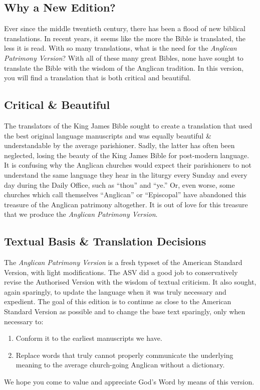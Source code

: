 \documentclass[twocolumn,twoside,titlepage,10pt]{book}\usepackage[paperheight=210mm,paperwidth=148mm,inner=25.4mm,outer=20mm,top=15mm,bottom=15mm,heightrounded]{geometry}
\begin{document}
	\begin{onecolumn}
	\chapter{Why a New Edition?}
	Ever since the middle twentieth century, there has been a flood of new biblical translations. In recent years, it seems like the more the Bible is translated, the less it is read. With so many translations, what is the need for the \textit{Anglican Patrimony Version}? With all of these many great Bibles, none have sought to translate the Bible with the wisdom of the Anglican tradition. In this version, you will find a translation that is both critical and beautiful.
	\section{Critical \& Beautiful}
The translators of the King James Bible sought to create a translation that used the best original language manuscripts and was equally beautiful \& understandable by the average parishioner. Sadly, the latter has often been neglected, losing the beauty of the King James Bible for post-modern language. It is confusing why the Anglican churches would expect their parishioners to not understand the same language they hear in the liturgy every Sunday and every day during the Daily Office, such as ``thou'' and ``ye.'' Or, even worse, some churches which call themselves ``Anglican'' or ``Episcopal'' have abandoned this treasure of the Anglican patrimony altogether. It is out of love for this treasure that we produce the \textit{Anglican Patrimony Version}.
\section{Textual Basis \& Translation Decisions}
The \textit{Anglican Patrimony Version} is a fresh typeset of the American Standard Version, with light modifications. The ASV did a good job to conservatively revise the Authorised Version with the wisdom of textual criticism. It also sought, again sparingly, to update the language when it was truly necessary and expedient. The goal of this edition is to continue as close to the American Standard Version as possible and to change the base text sparingly, only when necessary to:
\begin{enumerate}
\item Conform it to the earliest manuscripts we have.
\item Replace words that truly cannot properly communicate the underlying meaning to the average church-going Anglican without a dictionary.
\end{enumerate}
We hope you come to value and appreciate God's Word by means of this version.
	\end{onecolumn}
\end{document}
